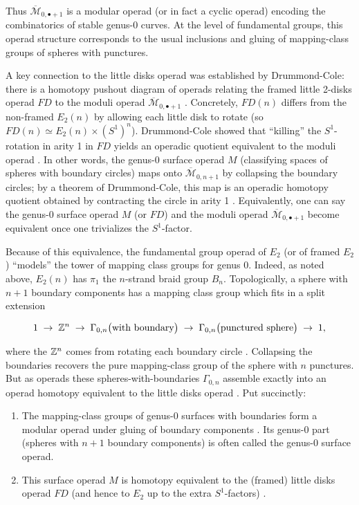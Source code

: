 Thus $\overline{\mathcal{M}}_{0,\bullet+1}$ is a modular operad (or in fact a cyclic operad) encoding the combinatorics of stable genus-0 curves.  At the level of fundamental groups, this operad structure corresponds to the usual inclusions and gluing of mapping-class groups of spheres with punctures.

A key connection to the little disks operad was established by Drummond-Cole: there is a homotopy pushout diagram of operads relating the framed little 2-disks operad $FD$ to the moduli operad $\overline{\mathcal{M}}_{0,\bullet+1}$ \cite{de_brito_operads_2019}. Concretely, $FD(n)$ differs from the non-framed $E_2(n)$ by allowing each little disk to rotate (so $FD(n)\simeq E_2(n)\times (S^1)^n$).  Drummond-Cole showed that “killing” the $S^1$-rotation in arity 1 in $FD$ yields an operadic quotient equivalent to the moduli operad \cite{de_brito_operads_2019}. In other words, the genus-0 surface operad $M$ (classifying spaces of spheres with boundary circles) maps onto ${\overline{\mathcal{M}}_{0,n+1}}$ by collapsing the boundary circles; by a theorem of Drummond-Cole, this map is an operadic homotopy quotient obtained by contracting the circle in arity 1 \cite{de_brito_operads_2019}. Equivalently, one can say the genus-0 surface operad $M$ (or $FD$) and the moduli operad $\overline{\mathcal{M}}_{0,\bullet+1}$ become equivalent once one trivializes the $S^1$-factor.

Because of this equivalence, the fundamental group operad of $E_2$ (or of framed $E_2$) “models” the tower of mapping class groups for genus 0.  Indeed, as noted above, $E_2(n)$ has $\pi_1$ the $n$-strand braid group $B_n$.  Topologically, a sphere with $n+1$ boundary components has a mapping class group which fits in a split extension

$$
  1 \;\to\; \mathbb{Z}^n \;\to\; \Gamma_{0,n}\bigl(\text{with boundary}\bigr) \;\to\; \Gamma_{0,n}\bigl(\text{punctured sphere}\bigr)\;\to\;1,
$$

where the $\mathbb{Z}^n$ comes from rotating each boundary circle \cite{borghi_lecture_2025}. Collapsing the boundaries recovers the pure mapping-class group of the sphere with $n$ punctures.  But as operads these spheres-with-boundaries ${\Gamma_{0,n}}$ assemble exactly into an operad homotopy equivalent to the little disks operad \cite{borghi_lecture_2025}\cite{de_brito_operads_2019}. Put succinctly:

\begin{enumerate}
    \item The mapping-class groups of genus-0 surfaces with boundaries form a modular operad under gluing of boundary components \cite{borghi_lecture_2025}. Its genus-0 part (spheres with $n+1$ boundary components) is often called the genus-0 surface operad.
    \item This surface operad $M$ is homotopy equivalent to the (framed) little disks operad $FD$ (and hence to $E_2$ up to the extra $S^1$-factors) \cite{de_brito_operads_2019}.
\end{enumerate}

